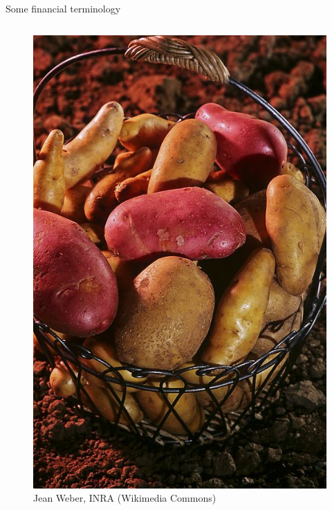 \documentclass{beamer}
\begin{document}
\begin{frame}{Some financial terminology}
\begin{columns}
\begin{column}{0.25\linewidth}
{\begin{figure}
				\includegraphics[width=1\linewidth]{images/potatoes}
				\caption{Jean Weber, INRA (Wikimedia Commons)}
			\end{figure}}
		\end{column}
	\end{columns}
	
\end{frame}
\end{document}
